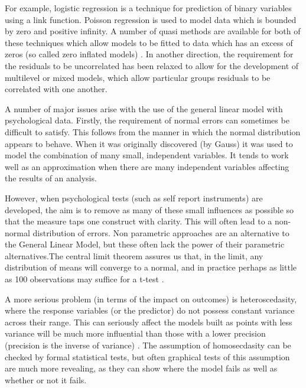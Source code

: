 For example, logistic regression is a technique for prediction of binary variables using a link function. Poisson regression is used to model data which is bounded by zero and positive infinity. A number of quasi methods are available for both of these techniques which allow models to be fitted to  data which has an excess of zeros (so called zero inflated models) \cite{gelman2007data,venables2002modern}. In another direction, the requirement for the residuals to be uncorrelated has been relaxed to allow for the development of multilevel or mixed models, which allow particular groups residuals to be correlated with one another\cite{gelman2007data}. %

A number of major issues arise with the use of the general linear model with psychological data. Firstly, the requirement of normal errors can sometimes be difficult to satisfy. This follows from the manner in which the normal distribution appears to behave. When it was originally discovered (by Gauss) \cite{stigler1986history} it was used to model the combination of many small, independent variables. It tends to work well as an approximation when there are many independent variables affecting the results of an analysis.

However, when psychological tests (such as self report instruments) are developed, the aim is to remove as many of these small influences as possible so that the measure taps one construct with clarity. This will often lead to a non-normal distribution of errors. Non parametric approaches are an alternative to the General Linear Model, but these often lack the power of their parametric alternatives.The central limit theorem assures us that, in the limit, any distribution of means will converge to a normal, and in practice perhaps as little as 100 observations may suffice for a t-test \cite{venables2002modern}. 

A more serious problem (in terms of the impact on outcomes) is heteroscedasity, where the response variables (or the predictor) do not possess constant variance across their range\cite{gelman2007data}. This can seriously affect the models built as points with less variance will be much more influential than those with a lower precision (precision is the inverse of variance)\cite{gelman2007data} . The assumption of homosecdasity can be checked by formal statistical tests, but often graphical tests of this assumption are much more revealing, as they can show where the model fails as well as whether or not it fails.

